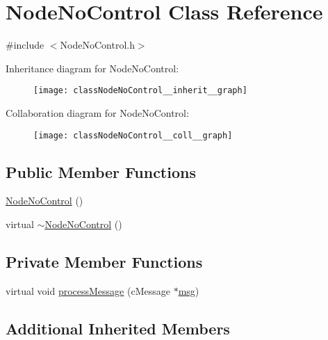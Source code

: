 \hypertarget{classNodeNoControl}{}\section{Node\+No\+Control Class Reference}
\label{classNodeNoControl}


{\ttfamily \#include $<$Node\+No\+Control.\+h$>$}



Inheritance diagram for Node\+No\+Control\+:\nopagebreak
\begin{figure}[H]
\begin{center}
\leavevmode
\texttt{[image: classNodeNoControl\_\_inherit\_\_graph]}
\end{center}
\end{figure}


Collaboration diagram for Node\+No\+Control\+:\nopagebreak
\begin{figure}[H]
\begin{center}
\leavevmode
\texttt{[image: classNodeNoControl\_\_coll\_\_graph]}
\end{center}
\end{figure}
\subsection*{Public Member Functions}
\begin{DoxyCompactItemize}
\item 
\hyperlink{classNodeNoControl_ae48bd313edf922a104d690959f232822}{Node\+No\+Control} ()
\item 
virtual \hyperlink{classNodeNoControl_a186d700d000404aa55658dd732e6ef4b}{$\sim$\+Node\+No\+Control} ()
\end{DoxyCompactItemize}
\subsection*{Private Member Functions}
\begin{DoxyCompactItemize}
\item 
virtual void \hyperlink{classNodeNoControl_aa83bc408fe3dab03f124ea5489946836}{process\+Message} (c\+Message $\ast$\hyperlink{Controller_8h_afa0f3b802fbc219228f7bb97996fa558}{msg})
\end{DoxyCompactItemize}
\subsection*{Additional Inherited Members}


